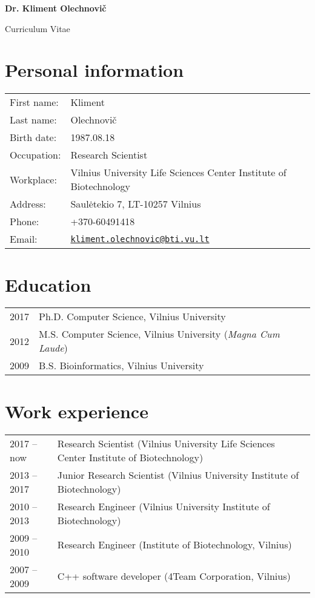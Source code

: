 \documentclass{article}
\def\name{Dr. Kliment Olechnovič}
\begin{document}
\begin{center}
{\huge \bf \name}
\end{center}

\begin{center}
{\Large Curriculum Vitae}
\end{center}


\section*{Personal information}
\begin{tabular}{p{}p{}}
First name:          & Kliment\\
Last name:           & Olechnovič\\
Birth date:          & 1987.08.18 \\
Occupation:          & Research Scientist \\
Workplace:           & Vilnius University Life Sciences Center Institute of Biotechnology \\
Address:             & Saulėtekio 7, LT-10257 Vilnius \\
Phone:               & +370-60491418 \\
Email:               & \href{mailto:kliment.olechnovic@bti.vu.lt}{\tt kliment.olechnovic@bti.vu.lt} \\
\end{tabular}


\section*{Education}
\begin{tabular}{p{}p{}}
2017 & Ph.D. Computer Science, Vilnius University \\
2012 & M.S.  Computer Science, Vilnius University (\emph{Magna Cum Laude}) \\
2009 & B.S.  Bioinformatics, Vilnius University
\end{tabular}


\section*{Work experience}
\begin{tabular}{p{}p{}}
2017 -- now  & Research Scientist (Vilnius University Life Sciences Center Institute of Biotechnology)\\
2013 -- 2017 & Junior Research Scientist (Vilnius University Institute of Biotechnology) \\
2010 -- 2013 & Research Engineer (Vilnius University Institute of Biotechnology) \\
2009 -- 2010 & Research Engineer (Institute of Biotechnology, Vilnius) \\
2007 -- 2009 & C++ software developer (4Team Corporation, Vilnius)
\end{tabular}
\end{document}
